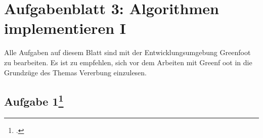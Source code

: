 \documentclass{bschlangaul-theorie}
\begin{document}
\chapter{Aufgabenblatt 3: Algorithmen implementieren I}

Alle Aufgaben auf diesem Blatt sind mit der Entwicklungsumgebung
Greenfoot zu bearbeiten. Es ist zu empfehlen, sich vor dem Arbeiten mit
Greenf oot in die Grundzüge des Themas Vererbung einzulesen.

%

\section{Aufgabe 1\footcite{oomup:ab:3}}
\end{document}
